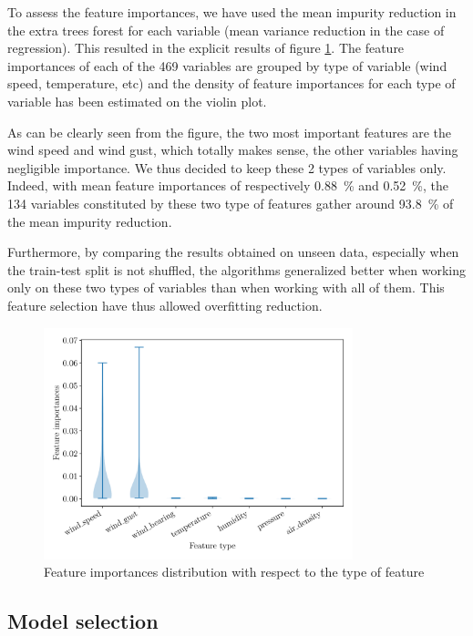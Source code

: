 \documentclass[a4paper, 12pt]{article}
\begin{document}
	To assess the feature importances, we have used the mean impurity reduction in the extra trees forest for each variable (mean variance reduction in the case of regression). This resulted in the explicit results of figure \ref{fig:wind_fi}. The feature importances of each of the 469 variables are grouped by type of variable (wind speed, temperature, etc) and the density of feature importances for each type of variable has been estimated on the violin plot.

	As can be clearly seen from the figure, the two most important features are the wind speed and wind gust, which totally makes sense, the other variables having negligible importance. We thus decided to keep these 2 types of variables only. Indeed, with mean feature importances of respectively \SI{0.88}{\percent} and \SI{0.52}{\percent}, the 134 variables constituted by these two type of features gather around \SI{93.8}{\percent} of the mean impurity reduction.

	Furthermore, by comparing the results obtained on unseen data, especially when the train-test split is not shuffled, the algorithms generalized better when working only on these two types of variables than when working with all of them. This feature selection have thus allowed overfitting reduction.

	\begin{figure}
		\centering
		\includegraphics[width=0.8\textwidth]{resources/pdf/wind_fi.pdf}
		\vspace{-1em}
		\caption{Feature importances distribution with respect to the type of feature}
		\label{fig:wind_fi}
	\end{figure}


\subsection{Model selection}
\end{document}
